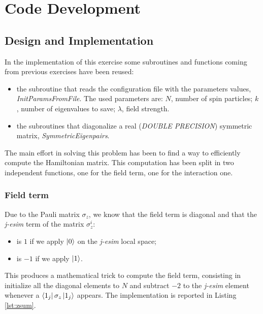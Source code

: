\documentclass[11pt,a4paper]{article}
\begin{document}
\section{Code Development} %

\subsection{Design and Implementation}

In the implementation of this exercise some subroutines and functions coming from previous exercises have been reused: 
\begin{itemize}
	\item the subroutine that reads the configuration file with the parameters values, \textit{InitParamsFromFile}. The used parameters are: $N$, number of spin particles; $k$, number of eigenvalues to save; $\lambda$, field strength.
	\item the subroutines that diagonalize a real (\textit{DOUBLE PRECISION}) symmetric matrix, \textit{SymmetricEigenpairs}.
\end{itemize}

The main effort in solving this problem has been to find a way to efficiently compute the Hamiltonian matrix. This computation has been split in two independent functions, one for the field term, one for the interaction one.

\subsubsection{Field term}
Due to the Pauli matrix $\sigma_{z}$, we know that the field term is diagonal and that the \textit{j-esim} term of the matrix $\sigma_{z}^{i}$:
\begin{itemize}
	\item is $1$ if we apply $\ket{0}$ on the \textit{j-esim} local space;
	\item is $-1$ if we apply $\ket{1}$.
\end{itemize}
This produces a mathematical trick to compute the field term, consisting in initialize all the diagonal elements to $N$ and subtract $-2$ to the \textit{j-esim} element whenever a $\bra{1_j} \sigma_{z} \ket{1_j}$ appears. The implementation is reported in Listing \ref{lst:zsum}.

\end{document}
